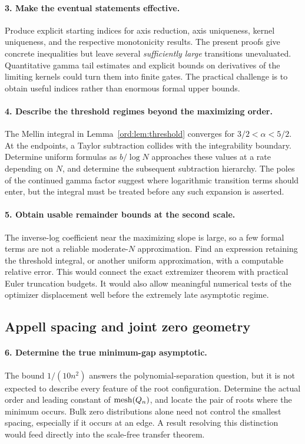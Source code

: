 \paragraph{3. Make the eventual statements effective.}
Produce explicit starting indices for axis reduction, axis uniqueness,
kernel uniqueness, and the respective monotonicity results.
The present proofs give concrete inequalities but leave several
\emph{sufficiently large} transitions unevaluated. Quantitative gamma
tail estimates and explicit bounds on derivatives of the limiting
kernels could turn them into finite gates. The practical challenge is
to obtain useful indices rather than enormous formal upper bounds.

\paragraph{4. Describe the threshold regimes beyond the maximizing
order.}
The Mellin integral in Lemma~\ref{ord:lem:threshold} converges for
$3/2<\alpha<5/2$. At the endpoints, a Taylor subtraction collides
with the integrability boundary. Determine uniform formulas as
$b/\log N$ approaches these values at a rate depending on $N$,
and determine the subsequent subtraction hierarchy. The poles of
the continued gamma factor suggest where logarithmic transition
terms should enter, but the integral must be treated before any
such expansion is asserted.

\paragraph{5. Obtain usable remainder bounds at the second scale.}
The inverse-log coefficient near the maximizing slope is large,
so a few formal terms are not a reliable moderate-$N$ approximation.
Find an expression retaining the threshold integral, or another
uniform approximation, with a computable relative error.
This would connect the exact extremizer theorem with practical
Euler truncation budgets. It would also allow meaningful numerical
tests of the optimizer displacement well before the extremely
late asymptotic regime.

\subsection{Appell spacing and joint zero geometry}

\paragraph{6. Determine the true minimum-gap asymptotic.}
The bound $1/(10n^2)$ answers the polynomial-separation question,
but it is not expected to describe every feature of the root
configuration. Determine the actual order and leading constant of
$\operatorname{mesh}(Q_n)$, and locate the pair of roots where the minimum occurs.
Bulk zero distributions alone need not control the smallest spacing,
especially if it occurs at an edge. A result resolving this distinction
would feed directly into the scale-free transfer theorem.

